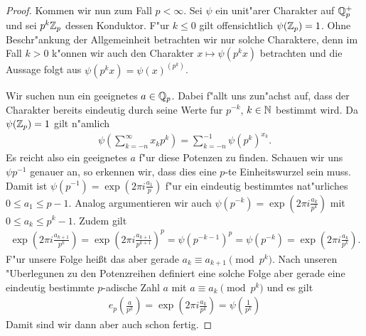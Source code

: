 \begin{proof}
			Kommen wir nun zum Fall $p<\infty$. 
			Sei $\psi$ ein unit"arer Charakter auf $\mathbb{Q}_p^+$ und sei $p^k{\mathbb{Z}_p}$ dessen Konduktor.
			F"ur $k\leq0$ gilt offensichtlich $\psi({\mathbb{Z}_p})=1$.
			Ohne Beschr"ankung der Allgemeinheit betrachten wir nur solche Charaktere, denn im Fall $k>0$ k"onnen wir auch den Charakter $x\mapsto \psi(p^kx)$ betrachten und die Aussage folgt aus $\psi(p^kx) = \psi(x)^{(p^k)}$.
			
			Wir suchen nun ein geeignetes $a\in{\mathbb{Q}_p}$. 
			Dabei f"allt uns zun"achst auf, dass der Charakter bereits eindeutig durch seine Werte fur $p^{-k}$, $k \in \mathbb{N}$ bestimmt wird.
			Da $\psi({\mathbb{Z}_p})=1$ gilt n"amlich
			\begin{align*}
				\psi \left( \sum_{k=-n}^\infty x_k p^k \right) = \sum_{k=-n}^{-1} \psi \left(p^k \right)^{x_k}.
			\end{align*}
			Es reicht also ein geeignetes $a$ f"ur diese Potenzen zu finden.
			Schauen wir uns $\psi{p^{-1}}$ genauer an, so erkennen wir, dass dies eine $p$-te Einheitswurzel sein muss.
			Damit ist $\psi(p^{-1}) = \exp(2\pi i \frac{a_1}{p})$ f"ur ein eindeutig bestimmtes nat"urliches $0\leq a_1 \leq p - 1$.
			Analog argumentieren wir auch $\psi(p^{-k}) = \exp(2\pi i \frac{a_k}{p^k})$ mit $0\leq a_k \leq p^k - 1$.
			Zudem gilt 
			\begin{align*}
				\exp\left(2\pi i \frac{a_{k+1}}{p^{k}}\right) = \exp\left(2\pi i \frac{a_{k+1}}{p^{k+1}}\right)^{p}= \psi(p^{-k-1})^p = \psi(p^{-k}) = \exp\left(2\pi i \frac{a_k}{p^k}\right).
			\end{align*}
			F"ur unsere Folge heißt das aber gerade $a_k \equiv a_{k+1} \pmod{p^k}$.
			Nach unseren "Uberlegunen zu den Potenzreihen definiert eine solche Folge aber gerade eine eindeutig bestimmte $p$-adische Zahl $a$ mit $a \equiv a_k \pmod{p^k}$ und es gilt
			\begin{align*}
				e_p\left( \frac{a}{p^{k}} \right) = \exp\left( 2\pi i \frac{a_k}{p^k} \right) = \psi \left( \frac{1}{p^k} \right)
			\end{align*}
			Damit sind wir dann aber auch schon fertig.
		\end{proof}
		
